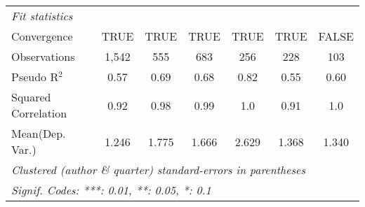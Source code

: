 \begin{tabular}{lcccccc}
   \midrule
   \emph{Fit statistics}\\
   Convergence                                                &TRUE           & TRUE          & TRUE         & TRUE         & TRUE          & FALSE\\  
   Observations                                               & 1,542         & 555           & 683          & 256          & 228           & 103\\  
   Pseudo R$^2$                                               & 0.57          & 0.69          & 0.68         & 0.82         & 0.55          & 0.60\\  
   Squared Correlation                                        & 0.92          & 0.98          & 0.99         & 1.0          & 0.91          & 1.0\\  
Mean(Dep. Var.) & 1.246 & 1.775 & 1.666 & 2.629 & 1.368 & 1.340 \\
   \midrule \midrule
   \multicolumn{7}{l}{\emph{Clustered (author \& quarter) standard-errors in parentheses}}\\
   \multicolumn{7}{l}{\emph{Signif. Codes: ***: 0.01, **: 0.05, *: 0.1}}\\
\end{tabular}
\par\endgroup
